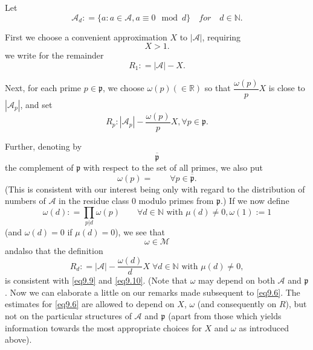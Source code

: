 Let
\begin{equation*}
\mathscr{A}_d: = \{ a: a \in \mathscr{A}, a \equiv  0 \mod d \}\quad for\quad
d \in \mathbb{N}.\tag{9.7}\label{eq9.7} 
\end{equation*}

First we choose a convenient approximation $X$ to $| \mathscr{A}|$,
requiring 
\begin{equation*}
X > 1.\tag{9.8}\label{eq9.8}
\end{equation*}
we write for the remainder 
\begin{equation*}
R_1: = | \mathscr{A}| -X.\tag{9.9}\label{eq9.9}
\end{equation*}

Next, for each prime $p \in \mathfrak{p}$, we choose $\omega(p) (\in
\mathbb{R})$ so that $\dfrac{\omega(p)}{p}X$ is close to
$|\mathscr{A}_p|$, and set  
\begin{equation*}
R_p: |\mathscr{A}_p|-\frac{\omega(p)}{p}X, \forall p \in
\mathfrak{p}.\tag{9.10}\label{eq9.10} 
\end{equation*}

Further, denoting by 
\begin{equation*}
\overline{\mathfrak{p}}\tag{9.11}\label{eq9.11}
\end{equation*}
the complement of $\mathfrak{p}$ with respect to the set of all
primes, we also put  
\begin{equation*}
\omega(p) = \qquad \forall p \in
\overline{\mathfrak{p}}.\tag{9.12}\label{eq9.12} 
\end{equation*}
(This is consistent with our interest being only with regard to the
distribution of numbers of $\mathscr{A}$ in the residue class $0$
modulo primes from $\mathfrak{p}$.) If we now define  
\begin{equation*}
\omega(d): = \prod_{p|d} \omega(p) \qquad \forall d \in \mathbb{N}
\text{ with }\mu (d) \neq 0, \omega(1):=1\tag{9.13}\label{eq9.13} 
\end{equation*}
(and $\omega(d) = 0$ if  $\mu (d)= 0$), we see that 
\begin{equation*}
\omega \in \mathscr{M} \tag{9.14}\label{eq9.14}
\end{equation*}
and\pageoriginale also that the definition
\begin{equation*}
R_d : = | \mathscr{A}|- \frac{\omega(d)}{d} X \; \forall d \in \mathbb{N}
\text{ with }\mu (d) \neq 0,\tag{9.15}\label{eq9.15}
\end{equation*}
is consistent with \eqref{eq9.9} and \eqref{eq9.10}. (Note that $\omega$ may
depend on both $\mathscr{A}$ and $\mathfrak{p}$. Now we can
elaborate a little on our remarks made subsequent to \eqref{eq9.6}. The
estimates for \eqref{eq9.6} are allowed to depend on $X$, $\omega$ (and
consequently on $R$), but not on the particular structures of
$\mathscr{A}$ and $\mathfrak{p}$ (apart from those which
yields information towards the most appropriate choices for $X$ and
$\omega$ as introduced above).  

